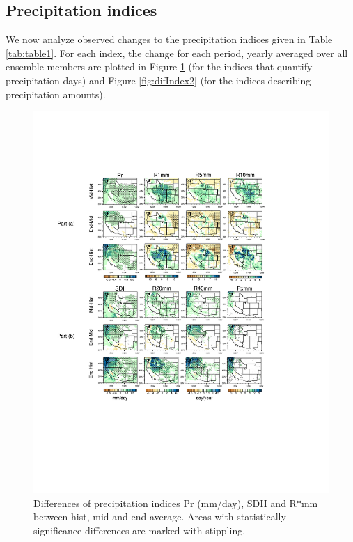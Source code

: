 \subsection{Precipitation indices}


We now analyze observed changes to the precipitation indices given in Table \ref{tab:table1}.  For each index, the change for each period, yearly averaged over all ensemble members are plotted in Figure \ref{fig:difIndex1} (for the indices that quantify precipitation days) and Figure \ref{fig:difIndex2} (for the indices describing precipitation amounts).

\begin{figure}
\begin{center}
\includegraphics[width=6in, trim={3.5cm 6.5cm 3.5cm 2.0cm},clip]{wd_index_all_years_part1.pdf} %
\caption{Differences of precipitation indices Pr (mm/day), SDII and R$\ast$mm between \textsf{hist}, \textsf{mid} and \textsf{end} average.  Areas with statistically significance differences are marked with stippling.}
\label{fig:difIndex1}
\end{center}
\end{figure}


